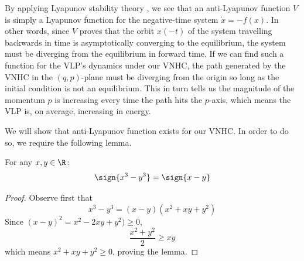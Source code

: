 By applying Lyapunov stability theory \cite{lyapunov},
we see that an anti-Lyapunov function
\(V\) is simply a Lyapunov function for the negative-time system 
\(\dot{x} = -f(x)\). In other words, since \(V\) proves that the orbit \(x(-t)\) 
of the system travelling backwards in time is asymptotically converging to the
equilibrium, the system must be diverging from the equilibrium in forward time.
If we can find such a function for the VLP's dynamics under our VNHC, the path
generated by the VNHC in the \((q,p)\)-plane must be diverging from the origin
so long as the initial condition is not an equilibrium.
This in turn tells us the magnitude of the momentum \(p\) is increasing every
time the path hits the \(p\)-axis, which means the VLP is, on average,
increasing in energy.

We will show that anti-Lyapunov function exists for our VNHC.
In order to do so, we require the following lemma.

\begin{lemma}\label{lemma:sign-of-cube}
   For any \(x,y \in \R\):
   \[
      \sign{x^3 - y^3} = \sign{x-y}
   \]
\end{lemma}
\begin{proof}
   Observe first that
   \[
      x^3 - y^3 =  (x-y)(x^2 + xy + y^2)
   \]
   Since \( (x-y)^2 = x^2 - 2xy + y^2) \geq 0 \), 
   \[
      \frac{x^2 + y^2}{2} \geq xy
   \]
   which means \(x^2 + xy + y^2 \geq 0\), proving the lemma.
\end{proof}


